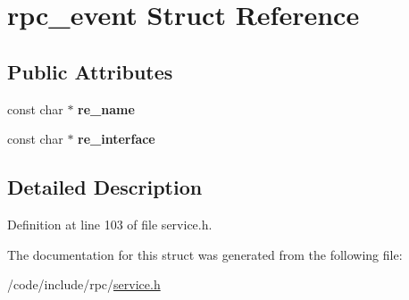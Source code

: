 \hypertarget{structrpc__event}{}\section{rpc\+\_\+event Struct Reference}
\label{structrpc__event}
\subsection*{Public Attributes}
\begin{DoxyCompactItemize}
\item 
const char $\ast$ {\bfseries re\+\_\+name}\hypertarget{structrpc__event_a13978e6f988e0857bee708b70103536c}{}\label{structrpc__event_a13978e6f988e0857bee708b70103536c}

\item 
const char $\ast$ {\bfseries re\+\_\+interface}\hypertarget{structrpc__event_a4a33676ef6d6b61fe00db6bcc499a281}{}\label{structrpc__event_a4a33676ef6d6b61fe00db6bcc499a281}

\end{DoxyCompactItemize}


\subsection{Detailed Description}


Definition at line 103 of file service.\+h.



The documentation for this struct was generated from the following file\+:\begin{DoxyCompactItemize}
\item 
/code/include/rpc/\hyperlink{service_8h}{service.\+h}\end{DoxyCompactItemize}
